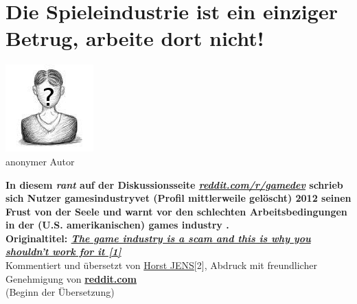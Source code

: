\section*{Die Spieleindustrie ist ein einziger Betrug, arbeite dort nicht!}
\label{redditrant}

\begin{center}
\includegraphics[width=0.8\linewidth]{redditrant/redditrant-nobody.jpg} \\ %
\footnotesize{anonymer Autor}
\end{center}

\textbf{In diesem \textit{rant} auf der Diskussionsseite \href{http://reddit.com/r/gamedev}{\textit{reddit.com/r/gamedev}} schrieb sich Nutzer 
\glqq
gamesindustryvet
\grqq (Profil mittlerweile gelöscht) 
2012 seinen Frust von der Seele und warnt vor den schlechten Arbeitsbedingungen in der
(U.S. amerikanischen) 
\glqq 
games industry
\grqq 
. \\ Originaltitel: \href{http://www.reddit.com/r/gamedev/comments/z83h2/the_games_industry_is_a_scam_and_this_is_why_you}{\textit{The game industry is a scam and this is why you shouldn't work for it [1]}}} \\

Kommentiert und übersetzt von \href{http://spielend-programmieren.at}{Horst JENS}[2], Abdruck mit freundlicher Genehmigung von \href{http://reddit.com}{\textbf{reddit.com}} \\

(Beginn der Übersetzung)

